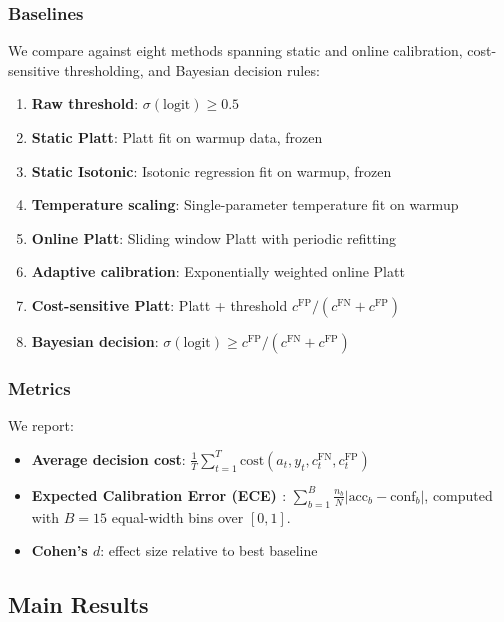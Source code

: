 \documentclass[12pt,a4paper]{article}
\begin{document}
\subsubsection{Baselines}

We compare against eight methods spanning static and online calibration, cost-sensitive thresholding, and Bayesian decision rules:

\begin{enumerate}
    \item \textbf{Raw threshold}: $\sigma(\text{logit}) \geq 0.5$
    \item \textbf{Static Platt}: Platt fit on warmup data, frozen
    \item \textbf{Static Isotonic}: Isotonic regression fit on warmup, frozen
    \item \textbf{Temperature scaling}: Single-parameter temperature fit on warmup
    \item \textbf{Online Platt}: Sliding window Platt with periodic refitting
    \item \textbf{Adaptive calibration}: Exponentially weighted online Platt
    \item \textbf{Cost-sensitive Platt}: Platt + threshold $c^{\text{FP}}/(c^{\text{FN}} + c^{\text{FP}})$
    \item \textbf{Bayesian decision}: $\sigma(\text{logit}) \geq c^{\text{FP}}/(c^{\text{FN}} + c^{\text{FP}})$
\end{enumerate}

\subsubsection{Metrics}

We report:
\begin{itemize}
    \item \textbf{Average decision cost}: $\frac{1}{T}\sum_{t=1}^T \text{cost}(a_t, y_t, c^{\text{FN}}_t, c^{\text{FP}}_t)$
    \item \textbf{Expected Calibration Error (ECE) \citep{Gneiting2007}}: $\sum_{b=1}^{B} \frac{n_b}{N} |\text{acc}_b - \text{conf}_b|$, computed with $B=15$ equal-width bins over $[0,1]$.
    \item \textbf{Cohen's $d$}: effect size relative to best baseline
\end{itemize}

\subsection{Main Results}
\end{document}
